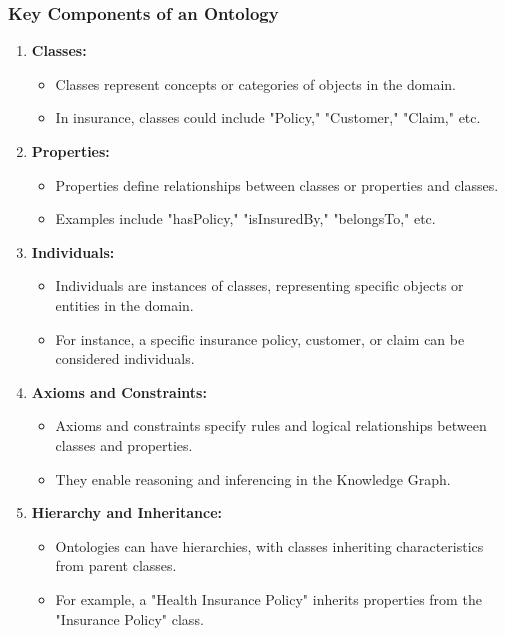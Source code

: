 \begin{frame}[fragile]
\frametitle{Key Components of an Ontology}
\begin{enumerate}
\item \textbf{Classes:}
\begin{itemize}
\item Classes represent concepts or categories of objects in the domain.
\item In insurance, classes could include "Policy," "Customer," "Claim," etc.
\end{itemize}

\item \textbf{Properties:}
\begin{itemize}
\item Properties define relationships between classes or properties and classes.
\item Examples include "hasPolicy," "isInsuredBy," "belongsTo," etc.
\end{itemize}

\item \textbf{Individuals:}
\begin{itemize}
\item Individuals are instances of classes, representing specific objects or entities in the domain.
\item For instance, a specific insurance policy, customer, or claim can be considered individuals.
\end{itemize}

\item \textbf{Axioms and Constraints:}
\begin{itemize}
\item Axioms and constraints specify rules and logical relationships between classes and properties.
\item They enable reasoning and inferencing in the Knowledge Graph.
\end{itemize}

\item \textbf{Hierarchy and Inheritance:}
\begin{itemize}
\item Ontologies can have hierarchies, with classes inheriting characteristics from parent classes.
\item For example, a "Health Insurance Policy" inherits properties from the "Insurance Policy" class.
\end{itemize}
\end{enumerate}
\end{frame}


